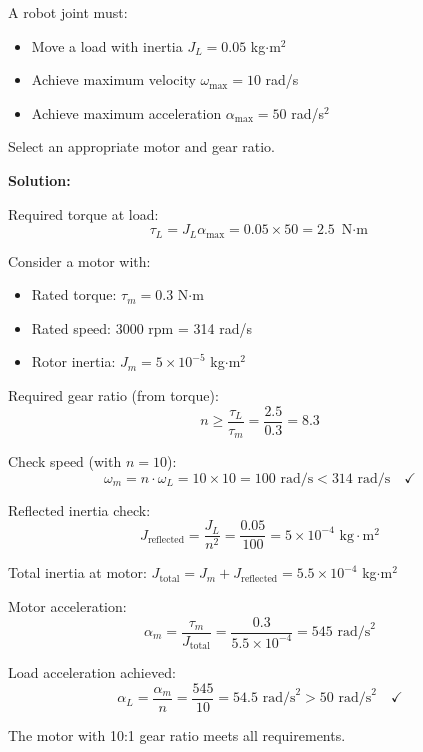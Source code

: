 \begin{examplebox}[title=Example 1.9: Robot Joint Motor Selection]
A robot joint must:
\begin{itemize}
    \item Move a load with inertia $J_L = 0.05$ kg$\cdot$m$^2$
    \item Achieve maximum velocity $\omega_{\max} = 10$ rad/s
    \item Achieve maximum acceleration $\alpha_{\max} = 50$ rad/s$^2$
\end{itemize}

Select an appropriate motor and gear ratio.

\textbf{Solution:}

Required torque at load:
\begin{equation}
\tau_L = J_L \alpha_{\max} = 0.05 \times 50 = 2.5 \text{ N$\cdot$m}
\end{equation}

Consider a motor with:
\begin{itemize}
    \item Rated torque: $\tau_m = 0.3$ N$\cdot$m
    \item Rated speed: 3000 rpm = 314 rad/s
    \item Rotor inertia: $J_m = 5 \times 10^{-5}$ kg$\cdot$m$^2$
\end{itemize}

Required gear ratio (from torque):
\begin{equation}
n \geq \frac{\tau_L}{\tau_m} = \frac{2.5}{0.3} = 8.3
\end{equation}

Check speed (with $n = 10$):
\begin{equation}
\omega_m = n \cdot \omega_L = 10 \times 10 = 100 \text{ rad/s} < 314 \text{ rad/s} \quad \checkmark
\end{equation}

Reflected inertia check:
\begin{equation}
J_{\text{reflected}} = \frac{J_L}{n^2} = \frac{0.05}{100} = 5 \times 10^{-4} \text{ kg$\cdot$m$^2$}
\end{equation}

Total inertia at motor: $J_{\text{total}} = J_m + J_{\text{reflected}} = 5.5 \times 10^{-4}$ kg$\cdot$m$^2$

Motor acceleration:
\begin{equation}
\alpha_m = \frac{\tau_m}{J_{\text{total}}} = \frac{0.3}{5.5 \times 10^{-4}} = 545 \text{ rad/s}^2
\end{equation}

Load acceleration achieved:
\begin{equation}
\alpha_L = \frac{\alpha_m}{n} = \frac{545}{10} = 54.5 \text{ rad/s}^2 > 50 \text{ rad/s}^2 \quad \checkmark
\end{equation}

The motor with 10:1 gear ratio meets all requirements.
\end{examplebox}

